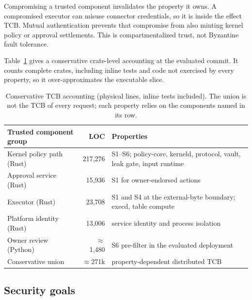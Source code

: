 \documentclass[letterpaper,twocolumn,10pt]{article}
\begin{document}
Compromising a trusted component invalidates the property it owns. A
compromised executor can misuse connector credentials, so it is inside the
effect TCB. Mutual authentication prevents that compromise from also minting
kernel policy or approval settlements. This is compartmentalized trust, not
Byzantine fault tolerance.

Table~\ref{tab:tcb} gives a conservative crate-level accounting at the
evaluated commit. It counts complete crates, including inline tests and code
not exercised by every property, so it over-approximates the executable
slice.

\begin{table}[!h]
\centering\footnotesize
\begin{tabularx}{\columnwidth}{@{}XrX@{}}
\toprule
\textbf{Trusted component group} & \textbf{LOC} & \textbf{Properties}\\
\midrule
Kernel policy path (Rust) & 217{,}276 & S1--S6; policy-core, kerneld, protocol, vault, leak gate, input runtime\\
Approval service (Rust) & 15{,}936 & S1 for owner-endorsed actions\\
Executor (Rust) & 23{,}708 & S1 and S4 at the external-byte boundary; execd, table compute\\
Platform identity (Rust) & 13{,}006 & service identity and process isolation\\
Owner review (Python) & ${\approx}$1{,}480 & S6 pre-filter in the evaluated deployment\\
\midrule
Conservative union & ${\approx}$271k & property-dependent distributed TCB\\
\bottomrule
\end{tabularx}
\caption{Conservative TCB accounting (physical lines, inline tests
included). The union is not the TCB of every request; each property relies
on the components named in its row.}
\label{tab:tcb}
\end{table}

\subsection{Security goals}
\end{document}
